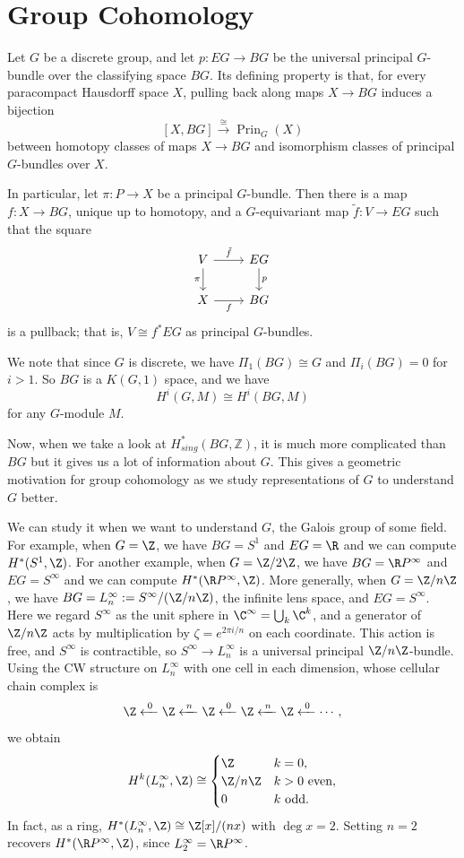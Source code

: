 \section{Group Cohomology}
Let $G$ be a discrete group, and let $p\colon EG \to BG$ be the universal
principal $G$-bundle over the classifying space $BG$. Its defining property
is that, for every paracompact Hausdorff space $X$, pulling back along maps
$X \to BG$ induces a bijection
\[
  [X, BG] \xrightarrow{\;\cong\;} \operatorname{Prin}_G(X)
\]
between homotopy classes of maps $X \to BG$ and isomorphism classes of
principal $G$-bundles over $X$.

In particular, let $\pi\colon P \to X$ be a principal $G$-bundle. Then there
is a map $f\colon X \to BG$, unique up to homotopy, and a $G$-equivariant map
$\tilde{f}\colon V \to EG$ such that the square
\[
\begin{tikzcd}
V \arrow[r, "\tilde{f}"] \arrow[d, "\pi"'] & EG \arrow[d, "p"] \\
X \arrow[r, "f"'] & BG
\end{tikzcd}
\]
is a pullback; that is, $V \cong f^{*}EG$ as principal $G$-bundles.

We note that since $G$ is discrete,
we have $\Pi_1(BG) \cong G$ and $\Pi_i(BG) = 0$ for $i > 1$.
So $BG$ is a $K(G, 1)$ space, and we have
\[
  H^i(G, M) \cong H^i(BG, M)
\]
for any $G$-module $M$.

Now, when we take a look at $H_{sing}^*(BG, \mathbb{Z})$,
it is much more complicated than $BG$
but it gives us a lot of information about $G$.
This gives a geometric motivation for group cohomology
as we study representations of $G$ to understand $G$ better.

We can study it when we want to understand
$G$, the Galois group of some field.
For example, when $G = \Z$,
we have $BG = S^1$ and $EG = \R$ and we can compute $H^*(S^1, \Z)$.
For another example, when $G = \Z/2\Z$,
we have $BG = \R P^{\infty}$ and $EG = S^{\infty}$ and we can compute
$H^*(\R P^{\infty}, \Z)$.
More generally, when $G = \Z/n\Z$,
we have $BG = L^{\infty}_n := S^{\infty}/(\Z/n\Z)$, the infinite lens space,
and $EG = S^{\infty}$. Here we regard $S^{\infty}$ as the unit sphere in
$\C^{\infty} = \bigcup_{k} \C^{k}$, and a generator of $\Z/n\Z$ acts by
multiplication by $\zeta = e^{2\pi i/n}$ on each coordinate. This action is
free, and $S^{\infty}$ is contractible, so $S^{\infty} \to L^{\infty}_n$ is a
universal principal $\Z/n\Z$-bundle. Using the CW structure on $L^{\infty}_n$
with one cell in each dimension, whose cellular chain complex is
\[
\Z \xleftarrow{\;0\;} \Z \xleftarrow{\;n\;} \Z \xleftarrow{\;0\;} \Z
\xleftarrow{\;n\;} \Z \xleftarrow{\;0\;} \cdots,
\]
we obtain
\[
H^{k}(L^{\infty}_n, \Z) \cong
\begin{cases}
\Z & k = 0, \\
\Z/n\Z & k > 0 \text{ even}, \\
0 & k \text{ odd}.
\end{cases}
\]
In fact, as a ring, $H^{*}(L^{\infty}_n, \Z) \cong \Z[x]/(nx)$ with
$\deg x = 2$. Setting $n = 2$ recovers $H^{*}(\R P^{\infty}, \Z)$, since
$L^{\infty}_2 = \R P^{\infty}$.

